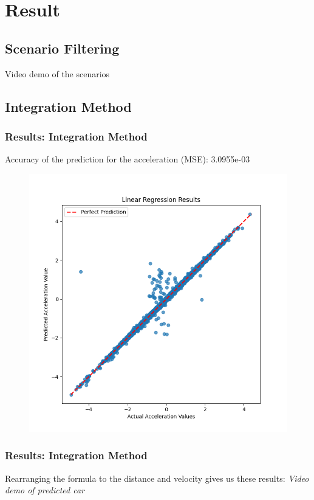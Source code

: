 
\section{Result}

\subsection{Scenario Filtering}
\begin{frame}
    \center Video demo of the scenarios
\end{frame}


\subsection{Integration Method}

\begin{frame}
  \frametitle{Results: Integration Method}
  Accuracy of the prediction for the acceleration (MSE): 3.0955e-03
  \begin{figure}
      \centering
        \includegraphics[width=0.6 \textwidth]{figures/graphs/Linear Regression Results.png}
  \end{figure}
\end{frame}

\begin{frame}
  \frametitle{Results: Integration Method}
    Rearranging the formula to the distance and velocity gives us these results:
    \center \textit{Video demo of predicted car}
\end{frame}
